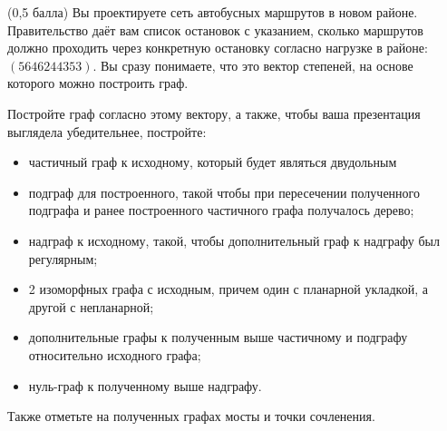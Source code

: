 \question
(0,5 балла) Вы проектируете сеть автобусных маршрутов в новом районе. Правительство даёт вам список остановок с указанием, сколько маршрутов должно проходить через конкретную остановку согласно нагрузке в районе: $(5 6 4 6 2 4 4 3 5 3)$. Вы сразу понимаете, что это вектор степеней, на основе которого можно построить граф.

Постройте граф согласно этому вектору, а также, чтобы ваша презентация выглядела убедительнее, постройте:

\begin{itemize}
\item частичный граф к исходному, который будет являться двудольным
\item подграф для построенного, такой чтобы при пересечении полученного подграфа и ранее построенного частичного графа получалось дерево;
\item надграф к исходному, такой, чтобы дополнительный граф к надграфу был регулярным;
\item 2 изоморфных графа с исходным, причем один с планарной укладкой, а другой с непланарной;
\item дополнительные графы к полученным выше частичному и подграфу относительно исходного графа;
\item нуль-граф к полученному выше надграфу.
\end{itemize}

Также отметьте на полученных графах мосты и точки сочленения.
